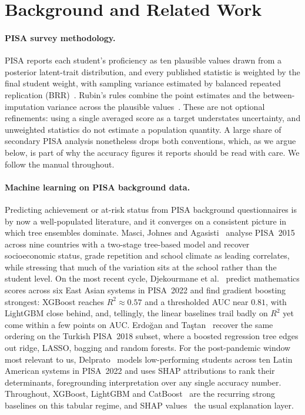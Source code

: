 \section{Background and Related Work}
\label{sec:related}

\paragraph{PISA survey methodology.}
PISA reports each student's proficiency as ten plausible values drawn from a
posterior latent-trait distribution, and every published statistic is weighted by the
final student weight, with sampling variance estimated by balanced repeated
replication (BRR)~\citep{oecd2024pisa,oecd2009manual}. Rubin's rules combine the point
estimates and the between-imputation variance across the plausible
values~\citep{rubin1987}. These are not optional refinements: using a single averaged
score as a target understates uncertainty, and unweighted statistics do not estimate a
population quantity. A large share of secondary PISA analysis nonetheless drops both
conventions, which, as we argue below, is part of why the accuracy figures it reports
should be read with care. We follow the manual throughout.

\paragraph{Machine learning on PISA background data.}
Predicting achievement or at-risk status from PISA background questionnaires is by now
a well-populated literature, and it converges on a consistent picture in which tree
ensembles dominate. Masci, Johnes and Agasisti~\citeyearpar{masci2018student} analyse
PISA~2015 across nine countries with a two-stage tree-based model and recover
socioeconomic status, grade repetition and school climate as leading correlates, while
stressing that much of the variation sits at the school rather than the student level.
On the most recent cycle, Djekourmane et al.~\citeyearpar{djekourmane2026east} predict
mathematics scores across six East Asian systems in PISA~2022 and find gradient
boosting strongest: XGBoost reaches $R^2\approx0.57$ and a thresholded AUC near
$0.81$, with LightGBM close behind, and, tellingly, the linear baselines trail badly on
$R^2$ yet come within a few points on AUC. Erdo\u{g}an and
Ta\c{s}tan~\citeyearpar{erdogan2024turkish} recover the same ordering on the Turkish PISA~2018
subset, where a boosted regression tree edges out ridge, LASSO, bagging and random
forests. For the post-pandemic window most relevant to us,
Delprato~\citeyearpar{delprato2025latam} models low-performing students across ten Latin
American systems in PISA~2022 and uses SHAP attributions to rank their determinants,
foregrounding interpretation over any single accuracy number. Throughout,
XGBoost, LightGBM and CatBoost~\citep{chen2016xgboost,ke2017lightgbm,prokhorenkova2018catboost}
are the recurring strong baselines on this tabular regime, and SHAP
values~\citep{lundberg2017shap} the usual explanation layer.

